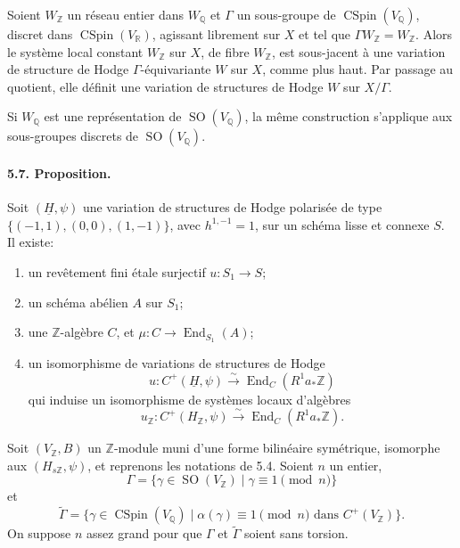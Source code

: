 \documentclass[10pt]{article}
\newcommand{\Q}{\mathbb{Q}}
\newcommand{\R}{\mathbb{R}}
\newcommand{\Z}{\mathbb{Z}}
\newcommand{\End}{\operatorname{End}}
\newcommand{\SO}{\operatorname{SO}}
\newcommand{\CSpin}{\operatorname{CSpin}}
\newcommand{\iso}{\xrightarrow{\sim}}
\begin{document}
Soient $W_\Z$ un réseau entier dans $W_\Q$ et $\Gamma$ un sous-groupe de $\CSpin(V_\Q)$, discret dans $\CSpin(V_\R)$, agissant librement sur $X$ et tel que $\Gamma W_\Z=W_\Z$. Alors le système local constant $W_\Z$ sur $X$, de fibre $W_\Z$, est sous-jacent à une variation de structure de Hodge $\Gamma$-équivariante $W$ sur $X$, comme plus haut. Par passage au quotient, elle définit une variation de structures de Hodge $W$ sur $X/\Gamma$.

Si $W_\Q$ est une représentation de $\SO(V_\Q)$, la même construction s'applique aux sous-groupes discrets de $\SO(V_\Q)$.

\paragraph{5.7. Proposition.} Soit $(\underline H,\psi)$ une variation de structures de Hodge polarisée de type $\{(-1,1),(0,0),(1,-1)\}$, avec $h^{1,-1}=1$, sur un schéma lisse et connexe $S$. Il existe:
\begin{enumerate}[label=\alph*)]
\item un revêtement fini étale surjectif $u:S_1\to S$;
\item un schéma abélien $A$ sur $S_1$;
\item une $\Z$-algèbre $C$, et $\mu:C\to\End_{S_1}(A)$;
\item un isomorphisme de variations de structures de Hodge
\[
u:C^+(\underline H,\psi)\iso \End_C(R^1a_*\Z)
\]
qui induise un isomorphisme de systèmes locaux d'algèbres
\[
u_\Z:C^+(H_\Z,\psi)\iso \End_C(R^1a_*\Z).
\]
\end{enumerate}

Soit $(V_\Z,B)$ un $\Z$-module muni d'une forme bilinéaire symétrique, isomorphe aux $(H_{s\Z},\psi)$, et reprenons les notations de 5.4. Soient $n$ un entier,
\[
\Gamma=\{\gamma\in\SO(V_\Z)\mid \gamma\equiv1\pmod n\}
\]
et
\[
\widetilde\Gamma=\{\gamma\in\CSpin(V_\Q)\mid \alpha(\gamma)\equiv1\pmod n
\text{ dans }C^+(V_\Z)\}.
\]
On suppose $n$ assez grand pour que $\Gamma$ et $\widetilde\Gamma$ soient sans torsion.
\end{document}
